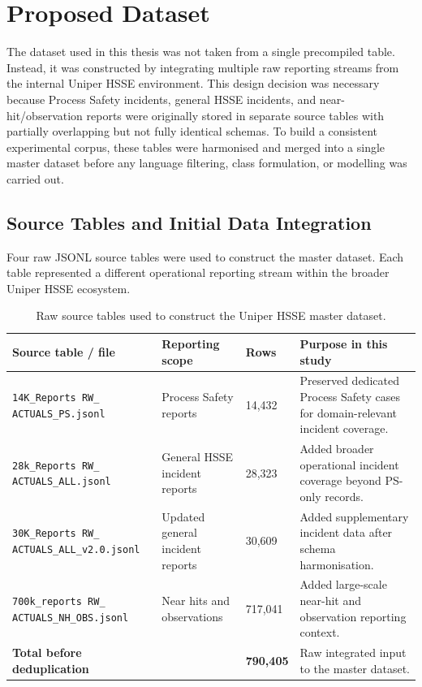 \documentclass[11pt, titlepage, bibliography=totoc]{scrreprt}
\begin{document}
\section{Proposed Dataset}

The dataset used in this thesis was not taken from a single precompiled table. Instead, it was constructed by integrating multiple raw reporting streams from the internal Uniper HSSE environment. This design decision was necessary because Process Safety incidents, general HSSE incidents, and near-hit/observation reports were originally stored in separate source tables with partially overlapping but not fully identical schemas. To build a consistent experimental corpus, these tables were harmonised and merged into a single master dataset before any language filtering, class formulation, or modelling was carried out.

\subsection{Source Tables and Initial Data Integration}

Four raw JSONL source tables were used to construct the master dataset. Each table represented a different operational reporting stream within the broader Uniper HSSE ecosystem.

\begin{table}[htbp]
\centering
\caption{Raw source tables used to construct the Uniper HSSE master dataset.}
\label{tab:source_tables}
\small
\renewcommand{\arraystretch}{1.2}
\begin{tabular}{p{4.8cm}p{3.4cm}p{1.8cm}p{5.0cm}}
\toprule
\textbf{Source table / file} & \textbf{Reporting scope} & \textbf{Rows} & \textbf{Purpose in this study} \\
\midrule
\texttt{14K\_Reports RW\_ ACTUALS\_PS.jsonl} 
& Process Safety reports 
& 14,432 
& Preserved dedicated Process Safety cases for domain-relevant incident coverage. \\

\texttt{28k\_Reports RW\_ ACTUALS\_ALL.jsonl} 
& General HSSE incident reports 
& 28,323 
& Added broader operational incident coverage beyond PS-only records. \\

\texttt{30K\_Reports RW\_ ACTUALS\_ALL\_v2.0.jsonl} 
& Updated general incident reports 
& 30,609 
& Added supplementary incident data after schema harmonisation. \\

\texttt{700k\_reports RW\_ ACTUALS\_NH\_OBS.jsonl} 
& Near hits and observations 
& 717,041 
& Added large-scale near-hit and observation reporting context. \\

\midrule
\textbf{Total before deduplication} 
& 
& \textbf{790,405} 
& Raw integrated input to the master dataset. \\
\bottomrule
\end{tabular}
\end{table}
\end{document}
